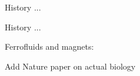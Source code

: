 \begin{frame}
  History ...
\end{frame}


\begin{frame}
  History ...
\end{frame}

\begin{frame}
  \small

  \begin{block}{Ferrofluids and magnets:}


    \bigskip


    \bigskip


  \end{block}

\end{frame}


\begin{frame}
  Add Nature paper on actual biology
\end{frame}